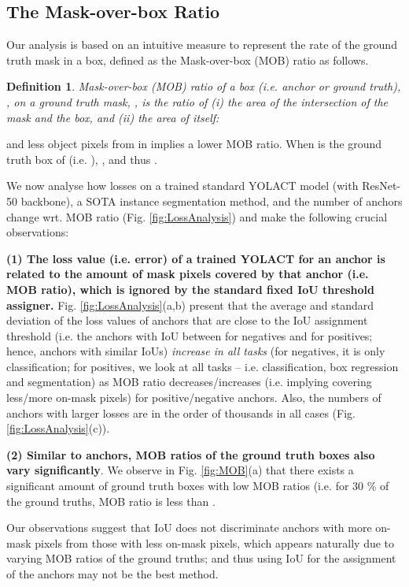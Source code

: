 \documentclass{bmvc2k}
\newtheorem{definition}{Definition}
\begin{document}
\subsection{The Mask-over-box Ratio}
\label{subsec:Analysis}

Our analysis is based on an intuitive measure to represent the rate of the ground truth mask in a box, defined as the Mask-over-box (MOB) ratio as follows.

\begin{definition}
Mask-over-box (MOB) ratio of a box (i.e. anchor or ground truth), , on a ground truth mask, , is the ratio of (i) the area of the intersection of the mask and the box, and (ii) the area of  itself: 
\end{definition}

  and less object pixels from  in  implies a lower MOB ratio. When  is the ground truth box of  (i.e. ), , and thus . 

We now analyse how losses on a trained standard YOLACT model (with ResNet-50 backbone), a SOTA instance segmentation method, and the number of anchors change wrt. MOB ratio (Fig. \ref{fig:LossAnalysis}) and make the following crucial observations:

\noindent \textbf{(1) The loss value (i.e. error) of a trained YOLACT for an anchor is related to the amount of mask pixels covered by that anchor (i.e. MOB ratio), which is ignored by the standard fixed IoU threshold assigner.} Fig. \ref{fig:LossAnalysis}(a,b) present that the average and standard deviation of the loss values of anchors that are close to the IoU assignment threshold (i.e. the anchors with IoU between  for negatives and  for positives; hence, anchors with similar IoUs) \textit{increase in all tasks} (for negatives, it is only classification; for positives, we look at all tasks -- i.e. classification, box regression and segmentation) as MOB ratio decreases/increases (i.e. implying covering less/more on-mask pixels) for positive/negative anchors. 
Also, the numbers of anchors with larger losses are in the order of thousands in all cases (Fig. \ref{fig:LossAnalysis}(c)). 


\noindent \textbf{(2) Similar to anchors, MOB ratios of the ground truth boxes also vary significantly}. We observe in Fig. \ref{fig:MOB}(a) that there exists a significant amount of ground truth boxes with low MOB ratios (i.e. for 30 \% of the ground truths, MOB ratio is less than . 

Our observations suggest that IoU does not discriminate anchors with more on-mask pixels from those with less on-mask pixels, which appears naturally due to varying MOB ratios of the ground truths; and thus using IoU for the assignment of the anchors may not be the best method. 
\end{document}
